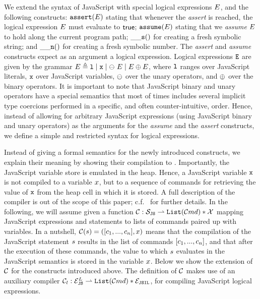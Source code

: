We extend the syntax of JavaScript with special logical expressions $E$, 
and the following constructs: %
 $\mathtt{assert}(E)$ stating that whenever the \emph{assert} is reached, 
the logical expression $E$ must evaluate to ${\sf true}$; 
 $\mathtt{assume}(E)$ stating that we \emph{assume} $E$ to hold along the
current program path; 
 $\_\_{\mathtt{s}}()$ for creating a fresh symbolic string; and
 $\_\_{\mathtt{n}}()$ for creating a fresh symbolic number. 
The \emph{assert} and \emph{assume} constructs expect as an argument 
a logical expression. 
Logical expressions $\mathtt{E}$ are given by the grammar 
$E \triangleq \mathtt{l} \mid \mathtt{x} \mid \ominus\ E \mid E \oplus E$, 
where $\mathtt{l}$ ranges over JavaScript literals, $\mathtt{x}$ over JavaScript variables, 
$\ominus$ over the \jsil unary operators, and $\oplus$ over the \jsil binary operators.
It is important to note that JavaScript binary and unary operators have a special 
semantics that most of times includes several implicit type coercions performed
in a specific, and often counter-intuitive, order. 
Hence, instead of allowing for arbitrary JavaScript expressions (using JavaScript 
binary and unary operators) as the arguments for the \emph{assume} and 
the \emph{assert} constructs, we define a simple and restricted syntax for logical expressions.

Instead of giving a formal semantics for the newly introduced constructs, we explain 
their meaning by showing their compilation to \jsil. 
Importantly, the JavaScript variable store is emulated in the heap. 
Hence, a JavaScript variable $\mathtt{x}$ is not compiled to a \jsil variable $x$, but to a sequence  
of \jsil commands for retrieving the value of $\mathtt{x}$ from the heap cell in which it is stored. 
A full description of the compiler is out of the scope of this paper; c.f.~\cite{javert}
for further details. 
%
In the following, we will assume given a function ${\mathcal C} : \mathcal{S}_{\mathtt{JS}} \rightharpoonup \mathtt{List}(\mathcal{C}md) * \mathcal{X}$ mapping JavaScript expressions 
and statements to lists of \jsil commands paired up with \jsil variables. 
In a nutshell, ${\mathcal C}(s) = ([ c_1, ..., c_n], x)$ means that the compilation 
of the JavaScript statement $s$ results in the list of \jsil commands $[ c_1, ..., c_n]$, 
and that after the execution of these commands, the value to which $s$ evaluates in the 
JavaScript semantics is stored in the \jsil variable $x$. 
%
Below we show the extension of ${\mathcal C}$ for the constructs introduced above. 
The definition of ${\mathcal C}$ makes use of an auxiliary compiler ${\mathcal C}_l : \mathcal{E}_{\mathtt{JS}}^L \rightharpoonup \mathtt{List}(\mathcal{C}md) * \mathcal{E}_{\mathtt{JSIL}}$, 
for compiling JavaScript logical expressions.

